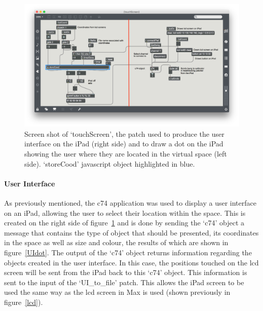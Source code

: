 \documentclass[../../main.tex]{subfiles}
\begin{document}
		\begin{figure}
			\centerline{\includegraphics[width=\textwidth]{Sections/Implementation/Max/images/Max/UserInterface/pTouchScreen_edit.png}}
			\caption{Screen shot of `touchScreen', the patch used to produce the user interface on the iPad (right side) and to draw a dot on the iPad showing the user where they are located in the virtual space (left side). `storeCood' javascript object highlighted in blue.}
			\label{touchScreenPatch}
		\end{figure}

		\paragraph{User Interface}
			As previously mentioned, the c74 application was used to display a user interface on an iPad, allowing the user to select their location within the space. This is created on the right side of figure~\ref{touchScreenPatch} and is done by sending the `c74' object a message that contains the type of object that should be presented, its coordinates in the space as well as size and colour, the results of which are shown in figure~\ref{UIdot}. The output of the `c74' object returns information regarding the objects created in the user interface. In this case, the positions touched on the lcd screen will be sent from the iPad back to this `c74' object. This information is sent to the input of the `UI\_to\_file' patch. This allows the iPad screen to be used the same way as the lcd screen in Max is used (shown previously in figure~\ref{lcd}).
\end{document}
